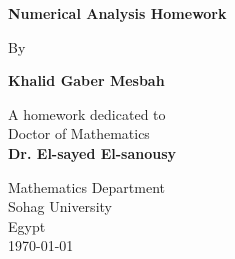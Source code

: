 \documentclass{exam}
\begin{document}
\begin{titlepage}
	\Large
	\begin{center}
		\vspace*{5cm}

		\textbf{Numerical Analysis Homework}

		\vspace{0.5cm}
		By

		\vspace{1cm}

		\textbf{Khalid Gaber Mesbah}

		\vfill

		A homework dedicated to\\
		\vspace{0.5cm}
		Doctor of Mathematics\\
		\vspace{0.5cm}
		\textbf{Dr. El-sayed El-sanousy}

		\vfill

		\vspace{0.8cm}

		Mathematics Department\\
		Sohag University\\
		Egypt\\
		\today

	\end{center}
\end{titlepage}
\end{document}

